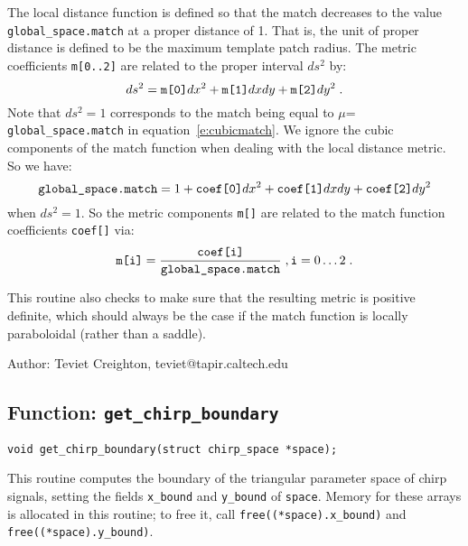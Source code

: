 The local distance function is defined so that the match decreases to
the value {\tt global\_space.match} at a proper distance of 1.  That
is, the unit of proper distance is defined to be the maximum template
patch radius.  The metric coefficients {\tt m[0..2]} are related to
the proper interval $ds^2$ by:
\begin{equation}
  ds^2 = \hbox{\tt m[0]}dx^2 + \hbox{\tt m[1]}dxdy +
         \hbox{\tt m[2]}dy^2 \; .
\end{equation}
Note that $ds^2=1$ corresponds to the match being equal to $\mu$={\tt
global\_space.match} in equation~\ref{e:cubicmatch}.  We ignore the
cubic components of the match function when dealing with the local
distance metric.  So we have:
\begin{equation}
  \hbox{\tt global\_space.match} = 1 + \hbox{\tt coef[0]}dx^2
                                    + \hbox{\tt coef[1]}dxdy
                                    + \hbox{\tt coef[2]}dy^2
\end{equation}
when $ds^2=1$.  So the metric components {\tt m[]} are related to the match
function coefficients {\tt coef[]} via:
\begin{equation}
  \hbox{\tt m[i]} = \frac{\hbox{\tt coef[i]}}
    {\hbox{\tt global\_space.match}}\;,  \hbox{\tt i}=0 \ldots 2 \;.
\end{equation}

This routine also checks to make sure that the resulting metric is
positive definite, which should always be the case if the match
function is locally paraboloidal (rather than a saddle).

\begin{description}
\item{Author:}
  Teviet Creighton, teviet@tapir.caltech.edu
\end{description}


\clearpage
\subsection{Function: {\tt get\_chirp\_boundary}}
\label{ss:get_chirp_boundary}

\begin{verbatim}
void get_chirp_boundary(struct chirp_space *space);
\end{verbatim}
This routine computes the boundary of the triangular parameter space
of chirp signals, setting the fields {\tt x\_bound} and {\tt y\_bound}
of {\tt *space}.  Memory for these arrays is allocated in this
routine; to free it, call {\tt free((*space).x\_bound)} and {\tt
free((*space).y\_bound)}.

